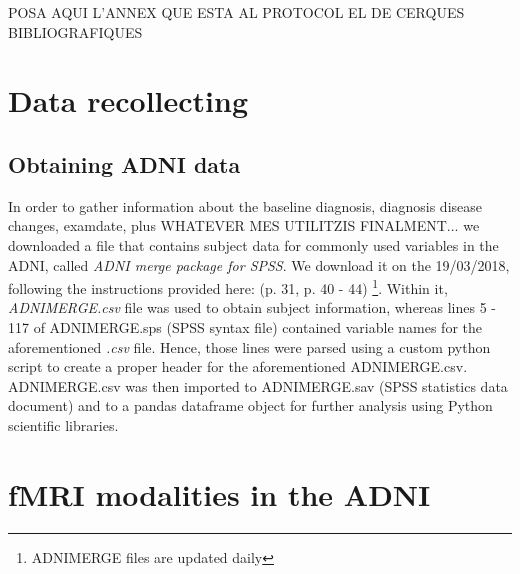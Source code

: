 		

			
	
	
	
POSA AQUI L'ANNEX QUE ESTA AL PROTOCOL EL DE CERQUES BIBLIOGRAFIQUES
			

		


	\section{Data recollecting}
		\subsection{Obtaining ADNI data} \label{subsec_appendix_obteniribaixarInfoADNI}
	
				In order to gather information about the baseline diagnosis, diagnosis disease changes, examdate, plus WHATEVER MES UTILITZIS FINALMENT... we downloaded a file that contains subject data for commonly used variables in the ADNI, called \textit{ADNI merge package for SPSS}. We download it on the 19/03/2018, following the instructions provided here: \cite{adni_data_training_part2} (p. 31, p. 40 - 44) \footnote{ADNIMERGE files are updated daily}. Within it, \textit{ADNIMERGE.csv} file was used to obtain subject information, whereas lines 5 - 117 of ADNIMERGE.sps (SPSS syntax file) contained variable names for the aforementioned \textit{.csv} file. Hence, those lines were parsed using a custom python script to create a proper header for the aforementioned ADNIMERGE.csv. ADNIMERGE.csv was then imported to ADNIMERGE.sav (SPSS statistics data document) and to a pandas dataframe object for further analysis using Python
		scientific libraries.
		
		\section{fMRI modalities in the ADNI} \label{modalitats_fMRI}
		
